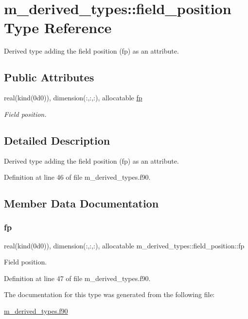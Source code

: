 \hypertarget{structm__derived__types_1_1field__position}{}\section{m\+\_\+derived\+\_\+types\+:\+:field\+\_\+position Type Reference}
\label{structm__derived__types_1_1field__position}


Derived type adding the field position (fp) as an attribute.  


\subsection*{Public Attributes}
\begin{DoxyCompactItemize}
\item 
real(kind(0d0)), dimension(\+:,\+:,\+:), allocatable \hyperlink{structm__derived__types_1_1field__position_a0eaa2d298380de3e3261d54e2293adb5}{fp}
\begin{DoxyCompactList}\small\item\em Field position. \end{DoxyCompactList}\end{DoxyCompactItemize}


\subsection{Detailed Description}
Derived type adding the field position (fp) as an attribute. 

Definition at line 46 of file m\+\_\+derived\+\_\+types.\+f90.



\subsection{Member Data Documentation}
\mbox{\label{structm__derived__types_1_1field__position_a0eaa2d298380de3e3261d54e2293adb5}} 
\subsubsection{\texorpdfstring{fp}{fp}}
{\footnotesize\ttfamily real(kind(0d0)), dimension(\+:,\+:,\+:), allocatable m\+\_\+derived\+\_\+types\+::field\+\_\+position\+::fp}



Field position. 



Definition at line 47 of file m\+\_\+derived\+\_\+types.\+f90.



The documentation for this type was generated from the following file\+:\begin{DoxyCompactItemize}
\item 
\hyperlink{m__derived__types_8f90}{m\+\_\+derived\+\_\+types.\+f90}\end{DoxyCompactItemize}
